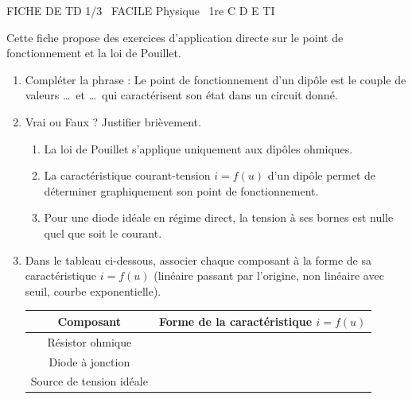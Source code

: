 \documentclass[11pt]{article}
\begin{document}
\begin{tcolorbox}[enhanced,colback=popink,colframe=popink,arc=10pt,boxrule=0pt,left=12pt,right=12pt,top=9pt,bottom=9pt]
{\color{white}\popxbold\small FICHE DE TD 1/3 \textbullet\ FACILE \hfill Physique \textbullet\ 1re C D E TI\par}
\end{tcolorbox}
\vspace{4pt}
Cette fiche propose des exercices d'application directe sur le point de fonctionnement et la loi de Pouillet.

\begin{exercice}
\begin{enumerate}
    \item Compléter la phrase : Le point de fonctionnement d'un dipôle est le couple de valeurs \ldots\ et \ldots\ qui caractérisent son état dans un circuit donné.
    \item Vrai ou Faux ? Justifier brièvement.
    \begin{enumerate}
        \item La loi de Pouillet s'applique uniquement aux dipôles ohmiques.
        \item La caractéristique courant-tension $i=f(u)$ d'un dipôle permet de déterminer graphiquement son point de fonctionnement.
        \item Pour une diode idéale en régime direct, la tension à ses bornes est nulle quel que soit le courant.
    \end{enumerate}
    \item Dans le tableau ci-dessous, associer chaque composant à la forme de sa caractéristique $i=f(u)$ (linéaire passant par l'origine, non linéaire avec seuil, courbe exponentielle).
    \begin{center}
    \begin{tabular}{|c|c|}
    \hline
    Composant & Forme de la caractéristique $i=f(u)$ \\ \hline
    Résistor ohmique & \\ \hline
    Diode à jonction & \\ \hline
    Source de tension idéale & \\ \hline
    \end{tabular}
    \end{center}
\end{enumerate}
\end{exercice}
\end{document}
